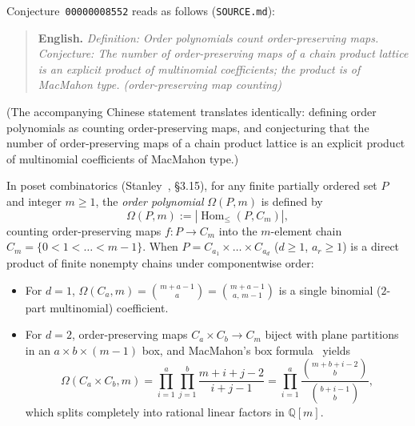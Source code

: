 \documentclass[11pt,a4paper]{article}
\newcommand{\coloneqq}{\mathrel{:=}}
\theoremstyle{definition}
\newcommand{\Homle}{\operatorname{Hom}_{\le}}
\begin{document}
Conjecture~\texttt{00000008552} reads as follows (\texttt{SOURCE.md}):
\begin{quote}
\textbf{English.} \emph{Definition: Order polynomials count order-preserving maps. Conjecture: The
number of order-preserving maps of a chain product lattice is an explicit product of multinomial
coefficients; the product is of MacMahon type. (order-preserving map counting)}
\end{quote}
(The accompanying Chinese statement translates identically: defining order polynomials as counting
order-preserving maps, and conjecturing that the number of order-preserving maps of a chain product
lattice is an explicit product of multinomial coefficients of MacMahon type.)

In poset combinatorics (Stanley~\cite{StanleyEC1}, \S3.15), for any finite partially ordered set
$P$ and integer $m \ge 1$, the \emph{order polynomial} $\Omega(P, m)$ is defined by
\[
  \Omega(P, m) \coloneqq |\Homle(P, C_m)|,
\]
counting order-preserving maps $f : P \to C_m$ into the $m$-element chain
$C_m = \{0 < 1 < \dots < m-1\}$. When $P = C_{a_1} \times \dots \times C_{a_d}$ ($d \ge 1$,
$a_r \ge 1$) is a direct product of finite nonempty chains under componentwise order:
\begin{itemize}
  \item For $d = 1$, $\Omega(C_a, m) = \binom{m + a - 1}{a} = \binom{m+a-1}{a,\, m-1}$ is a single
        binomial ($2$-part multinomial) coefficient.
  \item For $d = 2$, order-preserving maps $C_a \times C_b \to C_m$ biject with plane partitions in
        an $a \times b \times (m-1)$ box, and MacMahon's box formula~\cite{MacMahon1916} yields
        \begin{equation}\label{eq:macmahon-2d}
          \Omega(C_a \times C_b, m)
          = \prod_{i=1}^a \prod_{j=1}^b \frac{m + i + j - 2}{i + j - 1}
          = \prod_{i=1}^a \frac{\binom{m + b + i - 2}{b}}{\binom{b + i - 1}{b}},
        \end{equation}
        which splits completely into rational linear factors in $\mathbb{Q}[m]$.
\end{itemize}
\end{document}

